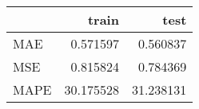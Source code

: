 \begin{tabular}{lrr}
\toprule
{} &      train &       test \\
\midrule
MAE  &   0.571597 &   0.560837 \\
MSE  &   0.815824 &   0.784369 \\
MAPE &  30.175528 &  31.238131 \\
\bottomrule
\end{tabular}
